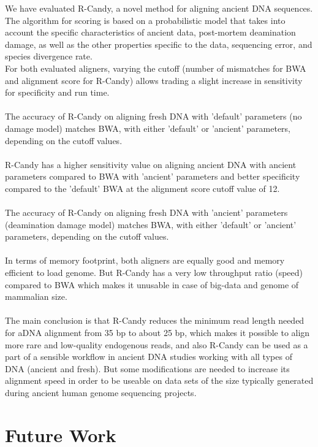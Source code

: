 \documentclass[11pt,a4paper]{report}
\begin{document}
We have evaluated R-Candy, a novel method for aligning ancient DNA sequences.
The algorithm for scoring is based on a probabilistic model that takes into account 
the specific characteristics of ancient data, post-mortem deamination damage, as 
well as the other properties specific to the data, sequencing error, and species
divergence rate. 
\\
For both evaluated aligners, varying the cutoff (number of mismatches for BWA 
and alignment score for R-Candy) allows trading a slight increase in sensitivity 
for specificity and run time.
\\\\
The accuracy of R-Candy on aligning fresh DNA with 'default' parameters (no damage model) 
matches BWA, with either 'default' or 'ancient' parameters, depending  on the cutoff values.
\\\\
R-Candy has a higher sensitivity value on aligning ancient DNA with ancient parameters
compared to BWA with 'ancient' parameters and better specificity compared to the 
'default' BWA at the alignment score cutoff value of 12.
\\\\
The accuracy of R-Candy on aligning fresh DNA with 'ancient' parameters
(deamination damage model) matches BWA, with either 'default' or 'ancient' 
parameters, depending  on the cutoff values.
\\\\
In terms of memory footprint, both aligners are equally good and memory efficient
to load genome. But R-Candy has a very low throughput ratio (speed) compared to 
BWA which makes it unusable in case of big-data and genome of mammalian size. 
\\\\
The main conclusion is that R-Candy reduces the minimum read length needed
for aDNA alignment from 35 bp to about 25 bp, which makes it possible to
align more rare and low-quality endogenous reads, and also R-Candy can be 
used as a part of a sensible workflow in ancient DNA studies working with all 
types of DNA (ancient and fresh). But some modifications are needed to 
increase its alignment speed in order to be useable on data sets of the
size typically generated during ancient human genome sequencing projects. 



 

\section{Future Work} \label{Future Work}
\end{document}
